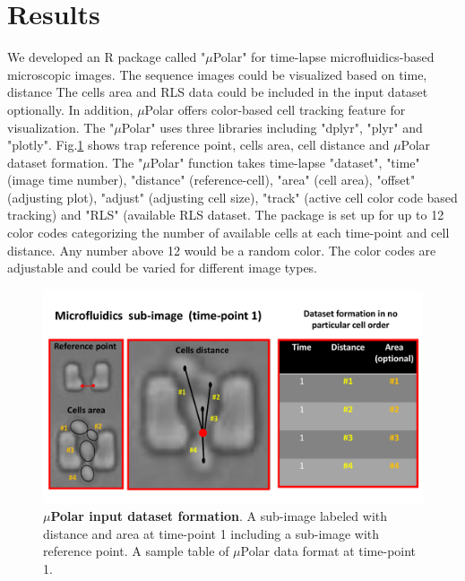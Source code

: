 \documentclass[conference]{IEEEtran}
\begin{document}
 


\section{Results}

We developed an R package called "$\mu$Polar" for time-lapse microfluidics-based microscopic images. The sequence images could be visualized based on time, distance The cells area and RLS data could be included in the input dataset optionally. In addition, $\mu$Polar offers color-based cell tracking feature for visualization. The "$\mu$Polar" uses three libraries including "dplyr", "plyr" and "plotly". Fig.\ref{fig:table} shows trap reference point, cells area, cell distance and $\mu$Polar dataset formation. The "$\mu$Polar" function takes time-lapse "dataset", "time" (image time number), "distance" (reference-cell), "area" (cell area), "offset" (adjusting plot), "adjust" (adjusting cell size), "track" (active cell color code based tracking) and "RLS" (available RLS dataset. The package is set up for up to 12 color codes categorizing the number of available cells at each time-point and cell distance. Any number above 12 would be a random color. The color codes are adjustable and could be varied for different image types.  

\begin{figure}
\centering
\includegraphics[width=\textwidth,height=10 cm]{Patterns/table.pdf}
\caption{ \textbf{ $\mu$Polar input dataset formation}. A sub-image labeled with distance and area at time-point 1 including a sub-image with reference point. A sample table of $\mu$Polar data format at time-point 1.}
\label{fig:table}
\end{figure}
\end{document}
